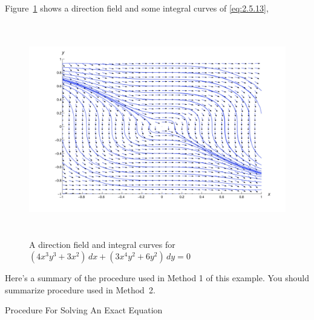 \documentclass{ximera}
\begin{document}
Figure~\ref{figure:2.5.1} shows a direction field and  some
integral curves of \eqref{eq:2.5.13},

              \begin{figure}[tbp]
  \centering
  \includegraphics[bb=-78 148 689 643,width=5.67in,height=3.66in,keepaspectratio]{fig020501}
\color{blue}
\caption{A direction field and  integral curves for
$(4x^3y^3+3x^2)\,dx+(3x^4y^2+6y^2)\,dy=0$}
  \label{figure:2.5.1}
\end{figure}



Here's a summary of the procedure used in Method 1 of this
example. You should summarize procedure used in Method~2.


Procedure For Solving An Exact
Equation
\end{document}
